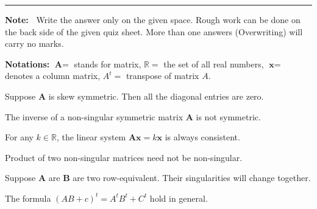 \documentclass[12pt]{examdesign}
\begin{document}
\begin{exampreface}
\hrule
\vspace{0.5cm}
{\noindent \bf Note:~}
Write the answer only on the given space. Rough work can be done on the back side of the given quiz sheet. More than one answers (Overwriting) will carry no marks.
\end{exampreface}
\begin{examclosing}
{\bf Notations:} $\textbf{A}=$ stands for matrix,  $\mathbb{R}=$ the set of all real numbers,  $\textbf{x}=$ denotes a column matrix, $A^t=$ transpose of matrix $A$.
\end{examclosing}



\begin{truefalse}[title={State True or False},
]
\begin{question}
  Suppose $\textbf{A}$ is skew symmetric. Then all the diagonal entries are zero.
\end{question}
\begin{question}
 The inverse of a non-singular symmetric matrix $\textbf{A}$ is not symmetric.
\end{question}
\begin{question}
 For any $k\in \mathbb R$, the linear system $\textbf{Ax}=k\textbf{x}$ is always consistent.
\end{question}

\begin{question}
 Product of two non-singular matrices need not be non-singular.
\end{question}

\begin{question}
 Suppose $\textbf{A}$ are $\textbf{B}$ are two row-equivalent. Their singularities will change together.
\end{question}

\begin{question}
 The formula \;$(AB+c)^t=A^tB^t+C^t$\; hold in general.
\end{question}
\end{truefalse}
\end{document}
